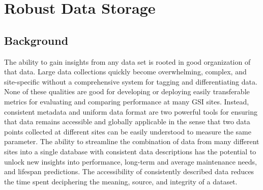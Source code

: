 %
\chapter{Robust Data Storage}
\label{sec:data-storage}


\section{Background}

The ability to gain insights from any data set is rooted in good organization of that data.
Large data collections quickly become overwhelming, complex, and site-specific without a comprehensive system for tagging and differentiating data.
None of these qualities are good for developing or deploying easily transferable metrics for evaluating and comparing performance at many GSI sites.
Instead, consistent metadata and uniform data format are two powerful tools for ensuring that data remains accessible and globally applicable in the sense that two data points collected at different sites can be easily understood to measure the same parameter.
The ability to streamline the combination of data from many different sites into a single database with consistent data descriptions has the potential to unlock new insights into performance, long-term and average maintenance needs, and lifespan predictions.
The accessibility of consistently described data reduces the time spent deciphering the meaning, source, and integrity of a dataset.

